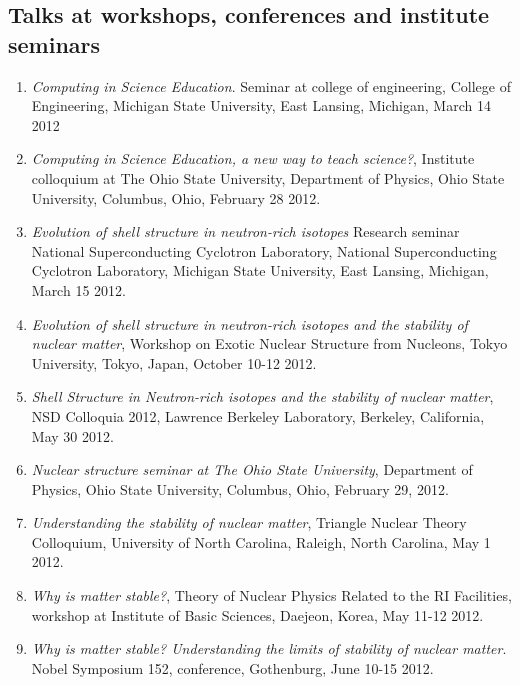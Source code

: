 \documentclass[prc,amsart,english,twocolumn,superscriptaddress,showpacs,floatfix]{revtex4}
\begin{document}
 \subsection*{Talks at workshops, conferences and institute seminars}
\begin{enumerate}
\item  {\em Computing in Science Education}. Seminar at college of engineering, 
College of Engineering, Michigan State University, East Lansing, Michigan, March 14 2012

\item  {\em Computing in Science Education, a new way to teach science?}, 
Institute colloquium at The Ohio State University, Department of Physics, 
Ohio State University, Columbus, Ohio, February 28 2012.

\item  {\em  Evolution of shell structure in neutron-rich isotopes}
Research seminar National Superconducting Cyclotron Laboratory, National Superconducting Cyclotron Laboratory, 
Michigan State University, East Lansing, Michigan, March 15 2012.

\item {\em  Evolution of shell structure in neutron-rich isotopes and the stability of nuclear matter}, 
Workshop on Exotic Nuclear Structure from Nucleons, Tokyo University, Tokyo, Japan, October 10-12 2012.

\item  {\em  Shell Structure in Neutron-rich isotopes and the stability of nuclear matter}, 
NSD Colloquia 2012, Lawrence Berkeley Laboratory, Berkeley, California, May 30 2012.

\item  {\em  Nuclear structure seminar at The Ohio State University}, 
Department of Physics, Ohio State University, Columbus, Ohio, February 29, 2012.

\item  {\em  Understanding the stability of nuclear matter},
Triangle Nuclear Theory Colloquium, University of North Carolina, Raleigh, North Carolina, May 1 2012.

\item  {\em 	Why is matter stable?}, Theory of Nuclear Physics Related to the RI Facilities, workshop at
Institute of Basic Sciences, Daejeon, Korea, May 11-12 2012.

\item {\em 	Why is matter stable? Understanding the limits of stability of nuclear matter}.
Nobel Symposium 152, conference, Gothenburg, June 10-15 2012.
\end{enumerate}
\end{document}
